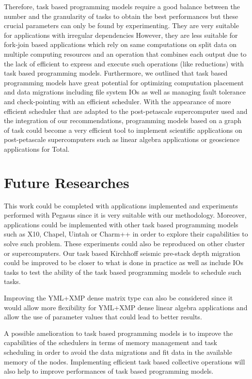 Therefore, task based programming models require a good balance between the number and the granularity of tasks to obtain the best performances but these crucial parameters can only be found by experimenting.
They are very suitable for applications with irregular dependencies
However, they are less suitable for fork-join based applications which rely on same computations on split data on multiple computing resources and an operation that combines each output due to the lack of efficient to express and execute such operations (like reductions) with task based programming models.
Furthermore, we outlined that task based programming models have great potential for optimizing computation placement and data migrations including file system IOs as well as managing fault tolerance and check-pointing with an efficient scheduler.
With the appearance of more efficient scheduler that are adapted to the post-petascale supercomputer used and the integration of our recommendations, programming models based on a graph of task could become a very efficient tool to implement scientific applications on post-petascale supercomputers such as linear algebra applications or geoscience applications for Total.

\section{Future Researches}

This work could be completed with applications implemented and experiments performed with Pegasus since it is very suitable with our methodology.
Moreover, applications could be implemented with other task based programming models such as X10, Chapel, Uintah or Charm++ in order to explore their capabilities to solve such problem.
These experiments could also be reproduced on other cluster or supercomputers.
Our task based Kirchhoff seismic pre-stack depth migration could be improved to be closer to what is done in practice as well as include IOs tasks to test the ability of the task based programming models to schedule such tasks.

Improving the YML+XMP dense matrix type can also be considered since it would allow more flexibility for YML+XMP dense linear algebra applications and allow the use of parameter values that could lead to better results.

A possible amelioration to task based programming models is to improve the capabilities of the schedulers in terms of memory management and task scheduling in order to avoid the data migrations and fit data in the available memory of the nodes.
Implementing efficient task based collective operations will also help to improve performances of task based programming models.

